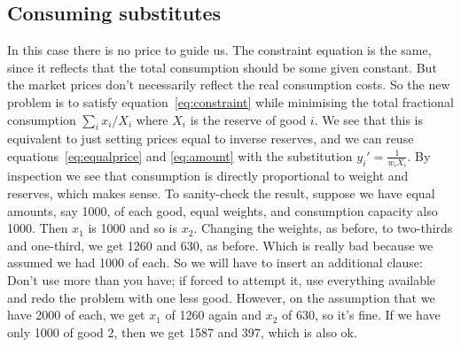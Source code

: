 
\subsection{Consuming substitutes}

In this case there is no price to guide us. The constraint equation is
the same, since it reflects that the total consumption should be some
given constant. But the market prices don't necessarily reflect the
real consumption costs. So the new problem is to satisfy equation~\ref{eq:constraint}
while minimising the total fractional consumption $\sum\limits_i
x_i/X_i$ where $X_i$ is the reserve of good $i$. We see that this is
equivalent to just setting prices equal to inverse reserves, and we
can reuse equations~\ref{eq:equalprice} and \ref{eq:amount} with the
substitution $y_i' = \frac{1}{w_iX_i}$. By inspection we see that
consumption is directly proportional to weight and reserves, which
makes sense. To sanity-check the result, suppose we have equal
amounts, say 1000, of each good, equal weights, and consumption
capacity also 1000. Then $x_1$ is 1000 and so is $x_2$. Changing the
weights, as before, to two-thirds and one-third, we get 1260 and 630,
as before. Which is really bad because we assumed we had 1000 of
each. So we will have to insert an additional clause: Don't use more
than you have; if forced to attempt it, use everything available and redo
the problem with one less good. However, on the assumption that we
have 2000 of each, we get $x_1$ of 1260 again and $x_2$ of 630, so
it's fine. If we have only 1000 of good 2, then we get 1587 and 397,
which is also ok.


